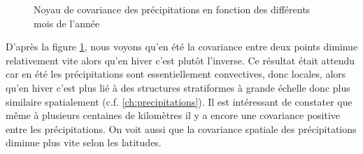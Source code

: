 \documentclass[a4paper,11pt]{article}
\numberwithin{equation}{section}
\begin{document}
\begin{figure}[H]
\begin{tabular}{ccc}
\end{tabular}
	\caption{Noyau de covariance des précipitations en fonction des différents mois de l'année}
	\label{fig-kernel-precip}
\end{figure}

D'après la figure \ref{fig-kernel-precip}, nous voyons qu'en été la covariance entre deux points diminue relativement vite alors qu'en hiver c'est plutôt l'inverse. Ce résultat était attendu car en été les précipitations sont essentiellement convectives, donc locales, alors qu'en hiver c'est plus lié à des structures stratiformes à grande échelle donc plus similaire spatialement (c.f. \ref{ch:precipitations}).
Il est intéressant de constater que même à plusieurs centaines de kilomètres il y a encore une covariance positive entre les précipitations. On voit aussi que la covariance spatiale des précipitations diminue plus vite selon les latitudes. 
\end{document}

